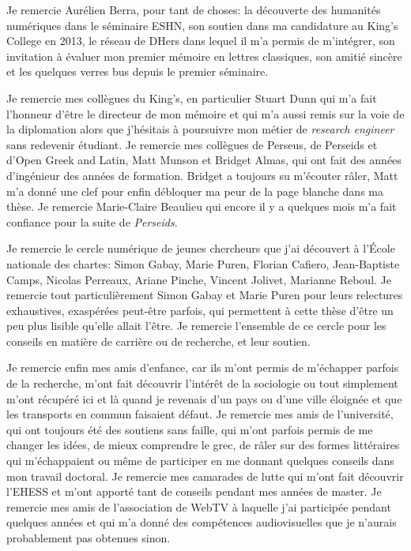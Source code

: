 Je remercie Aurélien Berra, pour tant de choses: la découverte des humanités numériques dans le séminaire ESHN, son soutien dans ma candidature au King's College en 2013, le réseau de DHers dans lequel il m'a permis de m'intégrer, son invitation à évaluer mon premier mémoire en lettres classiques, son amitié sincère et les quelques verres bus depuis le premier séminaire.

Je remercie mes collègues du King's, en particulier Stuart Dunn qui m'a fait l'honneur d'être le directeur de mon mémoire et qui m'a aussi remis sur la voie de la diplomation alors que j'hésitais à poursuivre mon métier de \textit{research engineer} sans redevenir étudiant. Je remercie mes collègues de Perseus, de Perseids et d'Open Greek and Latin, Matt Munson et Bridget Almas, qui ont fait des années d'ingénieur des années de formation. Bridget a toujours su m'écouter râler, Matt m'a donné une clef pour enfin débloquer ma peur de la page blanche dans ma thèse. Je remercie Marie-Claire Beaulieu qui encore il y a quelques mois m'a fait confiance pour la suite de \textit{Perseids}.

Je remercie le cercle numérique de jeunes chercheurs que j'ai découvert à l'École nationale des chartes: Simon Gabay, Marie Puren, Florian Cafiero, Jean-Baptiste Camps, Nicolas Perreaux, Ariane Pinche, Vincent Jolivet, Marianne Reboul. Je remercie tout particulièrement Simon Gabay et Marie Puren pour leurs relectures exhaustives, exaspérées peut-être parfois, qui permettent à cette thèse d'être un peu plus lisible qu'elle allait l'être. Je remercie l'ensemble de ce cercle pour les conseils en matière de carrière ou de recherche, et leur soutien.

Je remercie enfin mes amis d'enfance, car ils m'ont permis de m'échapper parfois de la recherche, m'ont fait découvrir l'intérêt de la sociologie ou tout simplement m'ont récupéré ici et là quand je revenais d'un pays ou d'une ville éloignée et que les transports en commun faisaient défaut. Je remercie mes amis de l'université, qui ont toujours été des soutiens sans faille, qui m'ont parfois permis de me changer les idées, de mieux comprendre le grec, de râler sur des formes littéraires qui m'échappaient ou même de participer en me donnant quelques conseils dans mon travail doctoral. Je remercie mes camarades de lutte qui m'ont fait découvrir l'EHESS et m'ont apporté tant de conseils pendant mes années de master. Je remercie mes amis de l'association de WebTV à laquelle j'ai participée pendant quelques années et qui m'a donné des compétences audiovisuelles que je n'aurais probablement pas obtenues sinon.

